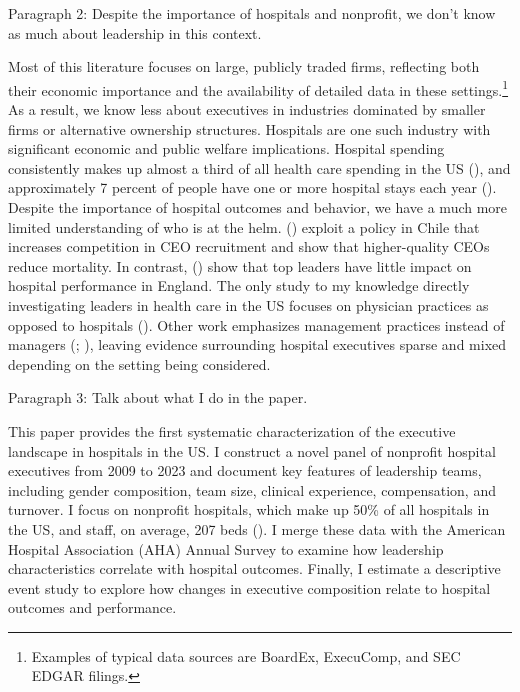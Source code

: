 \documentclass[12pt]{article}
\begin{document}
    \medskip

    Paragraph 2: Despite the importance of hospitals and nonprofit, we don't know as much about leadership in this context. 

    Most of this literature focuses on large, publicly traded firms, reflecting both their economic importance and the availability of detailed data in these settings.\footnote{Examples of typical data sources are BoardEx, ExecuComp, and SEC EDGAR filings.} As a result, we know less about executives in industries dominated by smaller firms or alternative ownership structures. Hospitals are one such industry with significant economic and public welfare implications. Hospital spending consistently makes up almost a third of all health care spending in the US (\cite{nlm_health_statistics}), and approximately 7 percent of people have one or more hospital stays each year (\cite{cdc2020hospitalstay}). Despite the importance of hospital outcomes and behavior, we have a much more limited understanding of who is at the helm. \citeauthor{munoz2025managers} (\cite*{munoz2025managers}) exploit a policy in Chile that increases competition in CEO recruitment and show that higher-quality CEOs reduce mortality. In contrast, \citeauthor{janke2019impact} (\cite*{janke2019impact}) show that top leaders have little impact on hospital performance in England. The only study to my knowledge directly investigating leaders in health care in the US focuses on physician practices as opposed to hospitals (\cite{la2023impact}). Other work emphasizes management practices instead of managers (\cite{bloom2015impact}; \cite{bloom2020healthy}), leaving evidence surrounding hospital executives sparse and mixed depending on the setting being considered. 
    
    


    \medskip

    Paragraph 3: Talk about what I do in the paper. 

    This paper provides the first systematic characterization of the executive landscape in hospitals in the US. I construct a novel panel of nonprofit hospital executives from 2009 to 2023 and document key features of leadership teams, including gender composition, team size, clinical experience, compensation, and turnover. I focus on nonprofit hospitals, which make up 50\% of all hospitals in the US, and staff, on average, 207 beds (\cite{ASPE_2023}). I merge these data with the American Hospital Association (AHA) Annual Survey to examine how leadership characteristics correlate with hospital outcomes. Finally, I estimate a descriptive event study to explore how changes in executive composition relate to hospital outcomes and performance.
    
\end{document}

